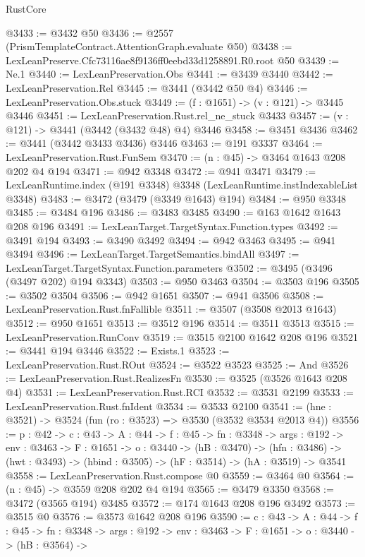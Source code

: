\begin{lexlean}{RustCore}
\begin{coremodule}
@3433 := @3432 @50
@3436 := @2557 (PrismTemplateContract.AttentionGraph.evaluate @50)
@3438 := LexLeanPreserve.Cfc73116ae8f9136ff0eebd33d1258891.R0.root @50
@3439 := Ne.{1}
@3440 := LexLeanPreservation.Obs
@3441 := @3439 @3440
@3442 := LexLeanPreservation.Rel
@3445 := @3441 (@3442 @50 @4)
@3446 := LexLeanPreservation.Obs.stuck
@3449 := (f : @1651) -> (v : @121) -> @3445 @3446
@3451 := LexLeanPreservation.Rust.rel_ne_stuck @3433
@3457 := (v : @121) -> @3441 (@3442 (@3432 @48) @4) @3446
@3458 := @3451 @3436
@3462 := @3441 (@3442 @3433 @3436) @3446
@3463 := @191 @3337
@3464 := LexLeanPreservation.Rust.FunSem
@3470 := (n : @45) -> @3464 @1643 @208 @202 @4 @194
@3471 := @942 @3348
@3472 := @941 @3471
@3479 := LexLeanRuntime.index (@191 @3348) @3348 (LexLeanRuntime.instIndexableList @3348)
@3483 := @3472 (@3479 (@3349 @1643) @194)
@3484 := @950 @3348
@3485 := @3484 @196
@3486 := @3483 @3485
@3490 := @163 @1642 @1643 @208 @196
@3491 := LexLeanTarget.TargetSyntax.Function.types
@3492 := @3491 @194
@3493 := @3490 @3492
@3494 := @942 @3463
@3495 := @941 @3494
@3496 := LexLeanTarget.TargetSemantics.bindAll
@3497 := LexLeanTarget.TargetSyntax.Function.parameters
@3502 := @3495 (@3496 (@3497 @202) @194 @3343)
@3503 := @950 @3463
@3504 := @3503 @196
@3505 := @3502 @3504
@3506 := @942 @1651
@3507 := @941 @3506
@3508 := LexLeanPreservation.Rust.fnFallible
@3511 := @3507 (@3508 @2013 @1643)
@3512 := @950 @1651
@3513 := @3512 @196
@3514 := @3511 @3513
@3515 := LexLeanPreservation.RunConv
@3519 := @3515 @2100 @1642 @208 @196
@3521 := @3441 @194 @3446
@3522 := Exists.{1}
@3523 := LexLeanPreservation.Rust.ROut
@3524 := @3522 @3523
@3525 := And
@3526 := LexLeanPreservation.Rust.RealizesFn
@3530 := @3525 (@3526 @1643 @208 @4)
@3531 := LexLeanPreservation.Rust.RCI
@3532 := @3531 @2199
@3533 := LexLeanPreservation.Rust.fnIdent
@3534 := @3533 @2100
@3541 := (hne : @3521) -> @3524 (fun (ro : @3523) => @3530 (@3532 @3534 @2013 @4))
@3556 := {p : @42} ->
  {c : @43} ->
  {A : @44} ->
  {f : @45} ->
  {fn : @3348} ->
  {args : @192} ->
  {env : @3463} ->
  {F : @1651} ->
  {o : @3440} ->
  (hB : @3470) ->
  (hfn : @3486) -> (hwt : @3493) -> (hbind : @3505) -> (hF : @3514) -> (hA : @3519) -> @3541
@3558 := LexLeanPreservation.Rust.compose @0
@3559 := @3464 @0
@3564 := (n : @45) -> @3559 @208 @202 @4 @194
@3565 := @3479 @3350
@3568 := @3472 (@3565 @194) @3485
@3572 := @174 @1643 @208 @196 @3492
@3573 := @3515 @0
@3576 := @3573 @1642 @208 @196
@3590 := {c : @43} ->
  {A : @44} ->
  {f : @45} ->
  {fn : @3348} ->
  {args : @192} ->
  {env : @3463} ->
  {F : @1651} ->
  {o : @3440} ->
  (hB : @3564) ->

\end{coremodule}
\end{lexlean}
